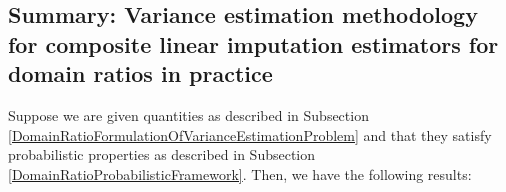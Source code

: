 
\clearpage
\subsection{Summary: Variance estimation methodology for composite linear imputation estimators for {\color{red}domain ratios} in practice}
\setcounter{theorem}{0}


\vskip 0.1cm
\noindent
Suppose we are given quantities as described in Subsection
\ref{DomainRatioFormulationOfVarianceEstimationProblem}
and
that they satisfy probabilistic properties as described in Subsection
\ref{DomainRatioProbabilisticFramework}.
\vskip 0.1cm
\noindent
Then, we have the following results:
